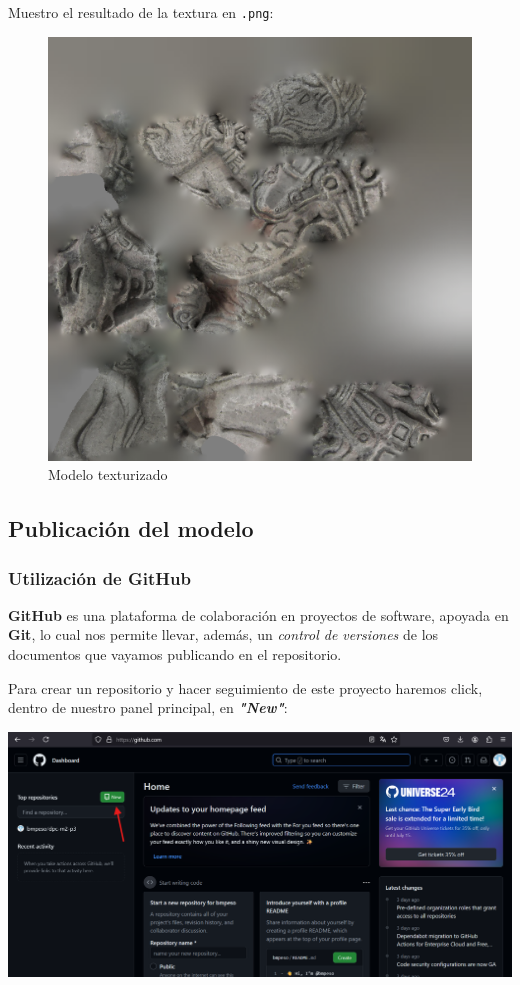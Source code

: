 \documentclass[options]{article}
\begin{document}
Muestro el resultado de la textura en \texttt{.png}:

\begin{figure}[H]
    \centering
    \includegraphics[scale=0.45]{images/PoissonMeshMayanSculpture_topo_sin_fisuras_tex.png}
    \caption{Modelo texturizado}
\end{figure}

\subsection{Publicación del modelo}

\subsubsection{Utilización de GitHub}

\textbf{GitHub} es una plataforma de colaboración en proyectos de software, apoyada en \textbf{Git}, lo cual nos permite llevar, además, un \textit{control de versiones} de los documentos que vayamos publicando en el repositorio. 


Para crear un repositorio y hacer seguimiento de este proyecto haremos click, dentro de nuestro panel principal, en \textbf{\textit{"New"}}:

\begin{center}
    \includegraphics[scale=0.35]{images/github_01.png}
\end{center}
\end{document}

